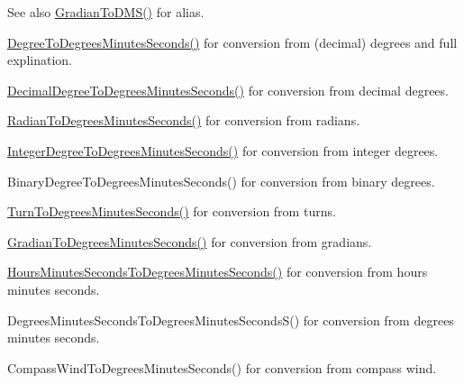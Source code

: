 \begin{DoxySeeAlso}{See also}
\mbox{\hyperlink{group___e_g_x_math-_conversions-_angle_conversions-_gradian_ga0b6700b55ab4a24fa581bf2af0dafdaa}{Gradian\+To\+D\+M\+S()}} for alias. 

\mbox{\hyperlink{group___e_g_x_math-_conversions-_angle_conversions-_degree_ga859585939255d52d010c780c68eb6e23}{Degree\+To\+Degrees\+Minutes\+Seconds()}} for conversion from (decimal) degrees and full explination. 

\mbox{\hyperlink{group___e_g_x_math-_conversions-_angle_conversions-_decimal_degree_gac5a5255c8d120f71b60d8f60de1a1b6e}{Decimal\+Degree\+To\+Degrees\+Minutes\+Seconds()}} for conversion from decimal degrees. 

\mbox{\hyperlink{group___e_g_x_math-_conversions-_angle_conversions-_radian_gadae98c255924fdc8b232b6539eae81a9}{Radian\+To\+Degrees\+Minutes\+Seconds()}} for conversion from radians. 

\mbox{\hyperlink{group___e_g_x_math-_conversions-_angle_conversions-_integer_degree_ga204317877546ea6bbafe5ff558f55a16}{Integer\+Degree\+To\+Degrees\+Minutes\+Seconds()}} for conversion from integer degrees. 

Binary\+Degree\+To\+Degrees\+Minutes\+Seconds() for conversion from binary degrees. 

\mbox{\hyperlink{group___e_g_x_math-_conversions-_angle_conversions-_turn_gaefdee18d878c2e66e7bd737c8900ab30}{Turn\+To\+Degrees\+Minutes\+Seconds()}} for conversion from turns. 

\mbox{\hyperlink{group___e_g_x_math-_conversions-_angle_conversions-_gradian_ga5c81967ddb8f677634d161713174e419}{Gradian\+To\+Degrees\+Minutes\+Seconds()}} for conversion from gradians. 

\mbox{\hyperlink{group___e_g_x_math-_conversions-_angle_conversions-_hours_minutes_seconds_gae9eb0acc65dfe6119936f29ac292afaa}{Hours\+Minutes\+Seconds\+To\+Degrees\+Minutes\+Seconds()}} for conversion from hours minutes seconds. 

Degrees\+Minutes\+Seconds\+To\+Degrees\+Minutes\+Seconds\+S() for conversion from degrees minutes seconds. 

Compass\+Wind\+To\+Degrees\+Minutes\+Seconds() for conversion from compass wind. 
\end{DoxySeeAlso}
\mbox{\label{group___e_g_x_math-_conversions-_angle_conversions-_gradian_ga0b6700b55ab4a24fa581bf2af0dafdaa}} 
